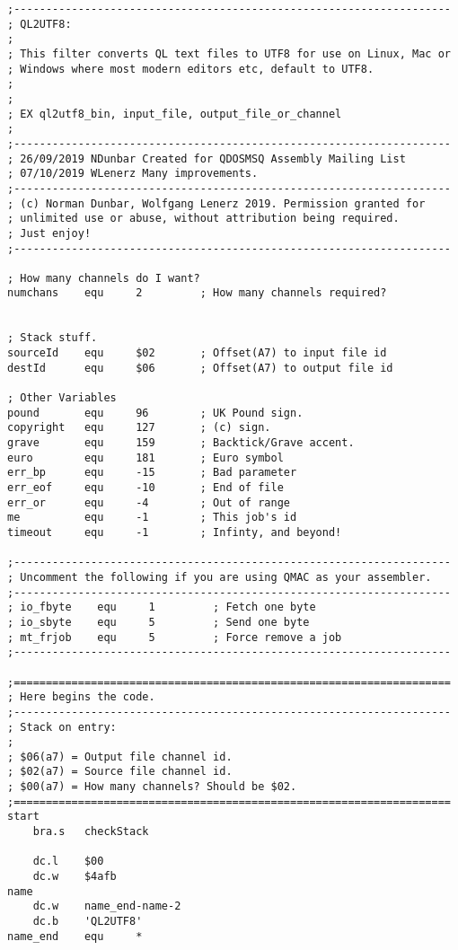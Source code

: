 \begin{lstlisting}[firstnumber=1, caption={Wolfgang's improved ql2utf8 Utility}]
;--------------------------------------------------------------------
; QL2UTF8:
;
; This filter converts QL text files to UTF8 for use on Linux, Mac or
; Windows where most modern editors etc, default to UTF8.
;
;
; EX ql2utf8_bin, input_file, output_file_or_channel
;
;--------------------------------------------------------------------
; 26/09/2019 NDunbar Created for QDOSMSQ Assembly Mailing List
; 07/10/2019 WLenerz Many improvements.
;--------------------------------------------------------------------
; (c) Norman Dunbar, Wolfgang Lenerz 2019. Permission granted for
; unlimited use or abuse, without attribution being required.
; Just enjoy!
;--------------------------------------------------------------------

; How many channels do I want?
numchans    equ     2         ; How many channels required?


; Stack stuff.
sourceId    equ     $02       ; Offset(A7) to input file id
destId      equ     $06       ; Offset(A7) to output file id

; Other Variables
pound       equ     96        ; UK Pound sign.
copyright   equ     127       ; (c) sign.
grave       equ     159       ; Backtick/Grave accent.
euro        equ     181       ; Euro symbol
err_bp      equ     -15       ; Bad parameter
err_eof     equ     -10       ; End of file
err_or      equ     -4        ; Out of range
me          equ     -1        ; This job's id
timeout     equ     -1        ; Infinty, and beyond!

;--------------------------------------------------------------------
; Uncomment the following if you are using QMAC as your assembler.
;--------------------------------------------------------------------
; io_fbyte    equ     1         ; Fetch one byte
; io_sbyte    equ     5         ; Send one byte
; mt_frjob    equ     5         ; Force remove a job
;--------------------------------------------------------------------

;====================================================================
; Here begins the code.
;--------------------------------------------------------------------
; Stack on entry:
;
; $06(a7) = Output file channel id.
; $02(a7) = Source file channel id.
; $00(a7) = How many channels? Should be $02.
;====================================================================
start
    bra.s   checkStack

    dc.l    $00
    dc.w    $4afb
name
    dc.w    name_end-name-2
    dc.b    'QL2UTF8'
name_end    equ     *


\end{lstlisting}
